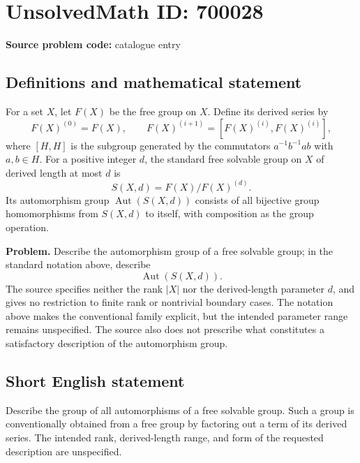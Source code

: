 \documentclass[11pt]{article}
\begin{document}
\section*{UnsolvedMath ID: 700028}
\textbf{Source problem code:} catalogue entry
\subsection{Definitions and mathematical statement}
For a set \(X\), let \(F(X)\) be the free group on \(X\). Define its derived series by
\[
F(X)^{(0)}=F(X),\qquad F(X)^{(i+1)}=[F(X)^{(i)},F(X)^{(i)}],
\]
where \([H,H]\) is the subgroup generated by the commutators \(a^{-1}b^{-1}ab\) with \(a,b\in H\). For a positive integer \(d\), the standard free solvable group on \(X\) of derived length at most \(d\) is
\[
S(X,d)=F(X)/F(X)^{(d)}.
\]
Its automorphism group \(\operatorname{Aut}(S(X,d))\) consists of all bijective group homomorphisms from \(S(X,d)\) to itself, with composition as the group operation.

\textbf{Problem.} Describe the automorphism group of a free solvable group; in the standard notation above, describe
\[
\operatorname{Aut}(S(X,d)).
\]
The source specifies neither the rank \(|X|\) nor the derived-length parameter \(d\), and gives no restriction to finite rank or nontrivial boundary cases. The notation above makes the conventional family explicit, but the intended parameter range remains unspecified. The source also does not prescribe what constitutes a satisfactory description of the automorphism group.
\subsection{Short English statement}
Describe the group of all automorphisms of a free solvable group. Such a group is conventionally obtained from a free group by factoring out a term of its derived series. The intended rank, derived-length range, and form of the requested description are unspecified.
\end{document}
